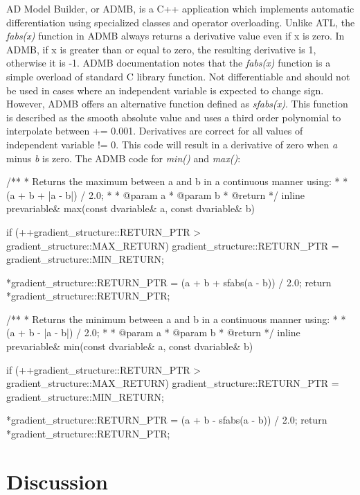 \documentclass[oneside]{article}
\begin{document}
AD Model Builder, or ADMB, is a C++ application which implements automatic differentiation using specialized classes and operator overloading. Unlike ATL, the \textit{fabs(x)} function in ADMB always returns a derivative value even if x is zero. In ADMB, if x is greater than or equal to zero, the resulting derivative is 1, otherwise it is -1. ADMB documentation notes that the \textit{fabs(x)} function is a simple overload of standard C library function. Not differentiable and should not be used in cases where an independent variable is expected to change sign. However, ADMB offers an alternative function defined as \textit{sfabs(x)}. This function is described as the smooth absolute value and uses a third order polynomial to interpolate between += 0.001. Derivatives are correct for all values of independent variable != 0. This code will result in a derivative of zero when \textit{a} minus \textit{b} is zero. The ADMB code for \textit{min()} and \textit{max()}:

\begin{cppsource}

/**
 * Returns the maximum between a and b in a continuous manner using:
 *
 * (a + b + |a - b|) / 2.0;
 *
 * @param a
 * @param b
 * @return
 */
inline prevariable& max(const dvariable& a, const dvariable& b) {
    if (++gradient_structure::RETURN_PTR > gradient_structure::MAX_RETURN)
        gradient_structure::RETURN_PTR = gradient_structure::MIN_RETURN;

    *gradient_structure::RETURN_PTR = (a + b + sfabs(a - b)) / 2.0;
    return *gradient_structure::RETURN_PTR;
}


/**
 * Returns the minimum between a and b in a continuous manner using:
 *
 * (a + b - |a - b|) / 2.0;
 *
 * @param a
 * @param b
 * @return
 */
inline prevariable& min(const dvariable& a, const dvariable& b) {
    if (++gradient_structure::RETURN_PTR > gradient_structure::MAX_RETURN)
        gradient_structure::RETURN_PTR = gradient_structure::MIN_RETURN;

    *gradient_structure::RETURN_PTR = (a + b - sfabs(a - b)) / 2.0;
    return *gradient_structure::RETURN_PTR;
}

\end{cppsource}



\section{Discussion}
\end{document}
